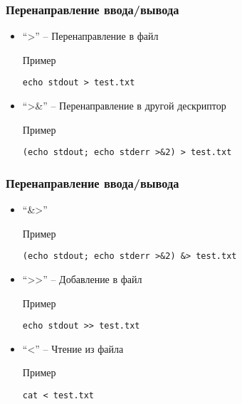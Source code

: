 \begin{frame}[fragile]
	\frametitle{Перенаправление ввода/вывода}

	\begin{itemize}
		\item ``>'' -- Перенаправление в файл
			\begin{block}{Пример}
				\begin{lstlisting}
echo stdout > test.txt
				\end{lstlisting}
			\end{block}
		\item ``>\&'' -- Перенаправление в другой дескриптор
			\begin{block}{Пример}
				\begin{lstlisting}
(echo stdout; echo stderr >&2) > test.txt
				\end{lstlisting}
			\end{block}
	\end{itemize}

\end{frame}



\begin{frame}[fragile]
	\frametitle{Перенаправление ввода/вывода}

	\begin{itemize}

		\item ``\&>''
			\begin{block}{Пример}
				\begin{lstlisting}
(echo stdout; echo stderr >&2) &> test.txt
				\end{lstlisting}
			\end{block}
		
		\item ``>>'' -- Добавление в файл
			\begin{block}{Пример}
				\begin{lstlisting}
echo stdout >> test.txt
				\end{lstlisting}
			\end{block}
																										                
		\item ``<'' -- Чтение из файла
			\begin{block}{Пример}
				\begin{lstlisting}
cat < test.txt
				\end{lstlisting}
			\end{block}
	\end{itemize}

\end{frame}


